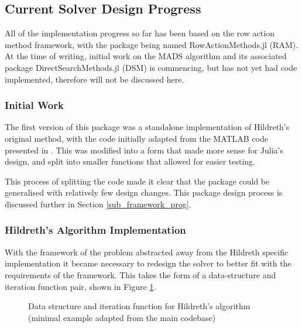 \subsection{Current Solver Design Progress}\label{sub_solver_progress}
All of the implementation progress so far has been based on the row action method framework, with the package being named RowActionMethods.jl (RAM). At the time of writing, initial work on the MADS algorithm and its associated package DirectSearchMethods.jl (DSM) is commencing, but has not yet had code implemented, therefore will not be discussed here.

\subsubsection{Initial Work}
The first version of this package was a standalone implementation of Hildreth's original method, with the code initially adapted from the MATLAB code presented in \cite{LiupingWang2009ModelMATLAB}. This was modified into a form that made more sense for Julia's design, and split into smaller functions that allowed for easier testing. 

This process of splitting the code made it clear that the package could be generalised with relatively few design changes. This package design process is discussed further in Section \ref{sub_framework_prog}. 


\subsubsection{Hildreth's Algorithm Implementation}\label{subsub:hildreth}
With the framework of the problem abstracted away from the Hildreth specific implementation it became necessary to redesign the solver to better fit with the requirements of the framework. This takes the form of a data-structure and iteration function pair, shown in Figure \ref{fig:hildreth_imp}.

\begin{figure}[th]
    \centering
    
    
    \caption{Data structure and iteration function for Hildreth's algorithm (minimal example adapted from the main codebase)}
    \label{fig:hildreth_imp}
\end{figure}

